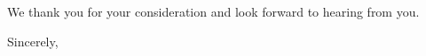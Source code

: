 \documentclass[11pt]{harvardletter}
\begin{document}
\begin{letter}{}









\vspace{5mm}

We thank you for your consideration and look forward to hearing from you.


\vspace{5mm}

\closing{Sincerely,}



\end{letter}
\end{document}
